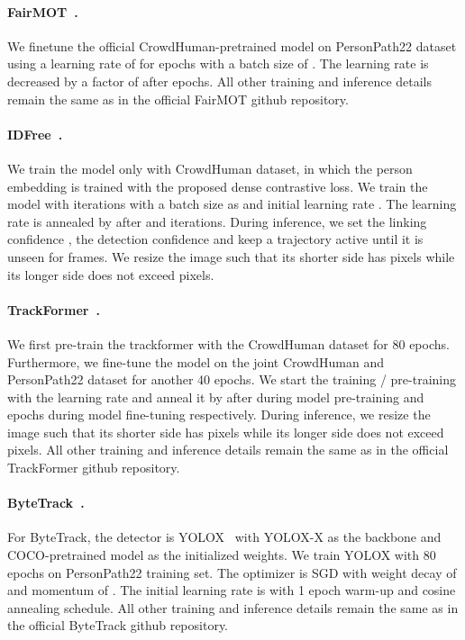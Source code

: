 \documentclass[runningheads]{llncs}
\begin{document}
\paragraph{FairMOT~\cite{fairmot}.} We finetune the official CrowdHuman-pretrained model on PersonPath22 dataset using a learning rate of  for  epochs with a batch size of . The learning rate is decreased by a factor of  after  epochs. All other training and inference details remain the same as in the official FairMOT github repository.


\paragraph{IDFree~\cite{pointid}.} We train the model only with CrowdHuman dataset, in which the person embedding is trained with the proposed dense contrastive loss. We train the model with  iterations with a batch size as  and initial learning rate . The learning rate is annealed by  after  and  iterations.  During inference, we set the linking confidence , the detection confidence  and keep a trajectory active until it is unseen for  frames. We resize the image such that its shorter side has  pixels while its longer side does not exceed  pixels.

\paragraph{TrackFormer~\cite{trackformer}.} We first pre-train the trackformer with the CrowdHuman dataset for 80 epochs. Furthermore, we fine-tune the model on the joint CrowdHuman and PersonPath22 dataset for another 40 epochs. We start the training / pre-training with the learning rate  and anneal it by  after  during model pre-training and  epochs during model fine-tuning respectively. During inference, we resize the image such that its shorter side has  pixels while its longer side does not exceed  pixels. All other training and inference details remain the same as in the official TrackFormer github repository.

\paragraph{ByteTrack~\cite{bytetrack}.} For ByteTrack, the detector is YOLOX~\cite{yolox} with YOLOX-X as the backbone and COCO-pretrained model as the initialized weights. We train YOLOX with 80 epochs on PersonPath22 training set. The optimizer is
SGD with weight decay of  and momentum of . The initial learning rate is  with 1 epoch warm-up and cosine annealing schedule. All other training and inference details remain the same as in the official ByteTrack github repository.  
\end{document}
